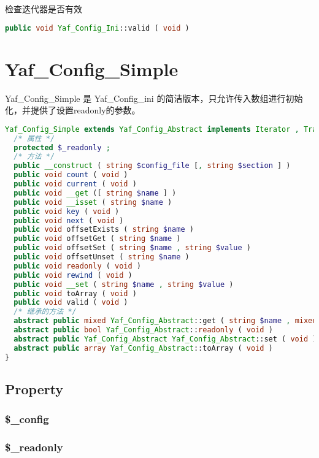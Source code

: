检查迭代器是否有效

\begin{lstlisting}[language=PHP]
public void Yaf_Config_Ini::valid ( void )
\end{lstlisting}


\chapter{Yaf\_Config\_Simple}


Yaf\_Config\_Simple 是 Yaf\_Config\_ini 的简洁版本，只允许传入数组进行初始化，并提供了设置readonly的参数。

\begin{lstlisting}[language=PHP]
Yaf_Config_Simple extends Yaf_Config_Abstract implements Iterator , Traversable , ArrayAccess , Countable {
  /* 属性 */
  protected $_readonly ;
  /* 方法 */
  public __construct ( string $config_file [, string $section ] )
  public void count ( void )
  public void current ( void )
  public void __get ([ string $name ] )
  public void __isset ( string $name )
  public void key ( void )
  public void next ( void )
  public void offsetExists ( string $name )
  public void offsetGet ( string $name )
  public void offsetSet ( string $name , string $value )
  public void offsetUnset ( string $name )
  public void readonly ( void )
  public void rewind ( void )
  public void __set ( string $name , string $value )
  public void toArray ( void )
  public void valid ( void )
  /* 继承的方法 */
  abstract public mixed Yaf_Config_Abstract::get ( string $name , mixed $value )
  abstract public bool Yaf_Config_Abstract::readonly ( void )
  abstract public Yaf_Config_Abstract Yaf_Config_Abstract::set ( void )
  abstract public array Yaf_Config_Abstract::toArray ( void )
}
\end{lstlisting}


\section{Property}

\subsection{\$\_config}



\subsection{\$\_readonly}


